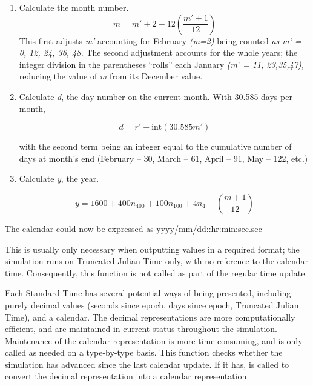 {\begin{enumerate}
{\begin{enumerate}
\begin{enumerate}
\begin{equation*}
m'=\text{int}\left(\frac{r'}{30.585}\right)
\end{equation*}

With approximately 30.585 days per month, the number of months in the 4-year
period can be determined.


\item Calculate
the month
number.
\begin{equation*}
m=m'+2-12\left(\frac{m'+1}{12}\right)
\end{equation*}
This first adjusts \textit{m'} accounting for
February \textit{(m=2) }being counted \textit{as m' =
0, 12, 24, 36, 48.  }The second adjustment accounts for the whole
years; the integer division in the parentheses
{\textquotedblleft}rolls{\textquotedblright} each January
\textit{(m' = 11, 23,35,47), }reducing the value of
\textit{m} from its December value.
\item Calculate \textit{d}, the day number on the current month.  With
30.585 days per month,

\begin{equation*}
d=r'-\text{int}\left(30.585m'\right)
\end{equation*}

with the
second term being an integer equal to the cumulative number of days at
month's end (February -- 30, March -- 61, April -- 91,
May -- 122, etc.)

\item Calculate \textit{y}, the year.

\begin{equation*}
y=1600+400n_{400}+100n_{100}+4n_{4}+\left(\frac{m+1}{12}\right)
\end{equation*}

\end{enumerate}
The calendar could now be expressed as  yyyy/mm/dd::hr:min:sec.sec




This is usually only necessary when outputting values in a required
format; the simulation runs on Truncated Julian Time only, with no
reference to the calendar time.  Consequently, this function is not
called as part of the regular time update.




Each Standard Time has several potential ways of being presented,
including purely decimal values (seconds since epoch, days since epoch,
Truncated Julian Time), and a calendar.  The decimal representations
are more computationally efficient, and are maintained in current
status throughout the simulation.  Maintenance of the calendar
representation is more time-consuming, and is only called as needed on
a type-by-type basis.  This function checks whether the simulation has
advanced since the last calendar update.  If it has,
is called to convert the
decimal representation into a calendar representation.


\end{enumerate}}
\end{enumerate}}
